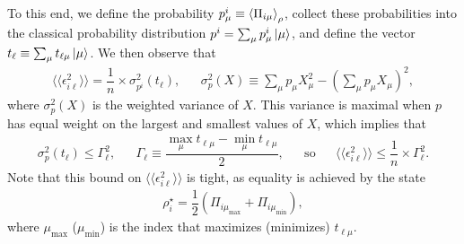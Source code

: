 \documentclass[nofootinbib,twocolumn]{revtex4-1}
\renewcommand{\t}{\text} %
\newcommand{\f}[2]{\dfrac{#1}{#2}} %
\newcommand{\p}[1]{\left(#1\right)} %
\newcommand{\bk}{\Braket} %
\newcommand{\bbk}[1]{\langle\!\langle #1 \rangle\!\rangle}
\begin{document}
To this end, we define the probability $p^i_\mu\equiv\bk{\Pi_{i\mu}}_\rho$, collect these probabilities into the classical probability distribution $p^i = \sum_\mu p^i_\mu \ket{\mu}$, and define the vector $t_\ell \equiv \sum_\mu t_{\ell\mu} \ket{\mu}$.
We then observe that
\begin{align}
  \bbk{\epsilon_{i\ell}^2} = \f1n \times \sigma_{p^i}^2\p{t_\ell},
  &&
  \sigma_p^2\p{X}
  \equiv \sum_\mu p_\mu X_\mu^2 - \p{\sum_\mu p_\mu X_\mu}^2,
\end{align}
where $\sigma_p^2\p{X}$ is the weighted variance of $X$.
This variance is maximal when $p$ has equal weight on the largest and smallest values of $X$, which implies that
\begin{align}
  \sigma_p^2\p{t_\ell} \le \Gamma_\ell^2,
  &&
  \Gamma_\ell \equiv \f{\max_\mu t_{\ell\mu} - \min_\mu t_{\ell\mu}}{2},
  &&
  \t{so}
  &&
  \bbk{\epsilon_{i\ell}^2} \le \f1n \times \Gamma_\ell^2.
\end{align}
Note that this bound on $\bbk{\epsilon_{i\ell}^2}$ is tight, as equality is achieved by the state
\begin{align}
  \rho_i^\star = \f12\p{\Pi_{i\mu_{\t{max}}} + \Pi_{i\mu_{\t{min}}}},
\end{align}
where $\mu_{\t{max}}$ ($\mu_{\t{min}}$) is the index that maximizes (minimizes) $t_{\ell\mu}$.
\end{document}

